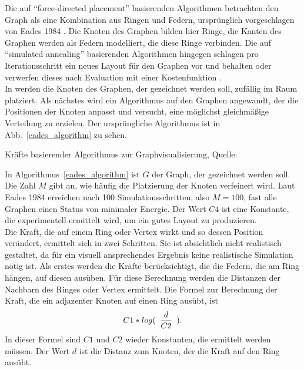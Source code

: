 \documentclass[12pt, a4paper]{article}
\begin{document}
Die auf "`force-directed placement"' basierenden Algorithmen betrachten den Graph als eine Kombination aus Ringen und Federn, ursprünglich vorgeschlagen von Eades 1984 \cite[S.~149]{eades1984heuristic}. Die Knoten des Graphen bilden hier Ringe, die Kanten des Graphen werden als Federn modelliert, die diese Ringe verbinden. Die auf "`simulated annealing"' basierenden Algorithmen hingegen schlagen pro Iterationsschritt ein neues Layout für den Graphen vor und behalten oder verwerfen dieses nach Evaluation mit einer Kostenfunktion \cite[S.~303ff]{davidson1996drawing}.\\

In  werden die Knoten des Graphen, der gezeichnet werden soll, zufällig im Raum platziert. Als nächstes wird ein Algorithmus auf den Graphen angewandt, der die Positionen der Knoten anpasst und versucht, eine möglichst gleichmäßige Verteilung zu erzielen. Der ursprüngliche Algorithmus ist in Abb.~\ref{eades_algorithm} zu sehen.\\

\begin{algorithm}
\caption{Kräfte basierender Algorithmus zur Graphvisualisierung, Quelle: \protect{}}
\label{eades_algorithm}
\begin{algorithmic}
	\State {}
	\State {}
	\State {}
		\State \hspace{\algorithmicindent} 
		\State \hspace{\algorithmicindent} 
	\State {}
\end{algorithmic}
\end{algorithm}

In Algorithmus~\ref{eades_algorithm} ist $G$ der Graph, der gezeichnet werden soll. Die Zahl $M$ gibt an, wie häufig die Platzierung der Knoten verfeinert wird. Laut Eades 1984 erreichen nach 100 Simulationsschritten, also $M=100$, fast alle Graphen einen Status von minimaler Energie. Der Wert $C4$ ist eine Konstante, die experimentell ermittelt wird, um ein gutes Layout zu produzieren.\\

Die Kraft, die auf einem Ring oder Vertex wirkt und so dessen Position verändert, ermittelt sich in zwei Schritten. Sie ist absichtlich nicht realistisch gestaltet, da für ein visuell ansprechendes Ergebnis keine realistische Simulation nötig ist. Als erstes werden die Kräfte berücksichtigt, die die Federn, die am Ring hängen, auf diesen ausüben. Für diese Berechnung werden die Distanzen der Nachbarn des Ringes oder Vertex ermittelt. Die Formel zur Berechnung der Kraft, die ein adjazenter Knoten auf einen Ring ausübt, ist
\begin{equation} \label{eades_attractiveForces}
C1*log(\enskip\frac{d}{C2}\enskip).
\end{equation}
In dieser Formel sind $C1$ und $C2$ wieder Konstanten, die ermittelt werden müssen. Der Wert $d$ ist die Distanz zum Knoten, der die Kraft auf den Ring ausübt.\\
\end{document}

